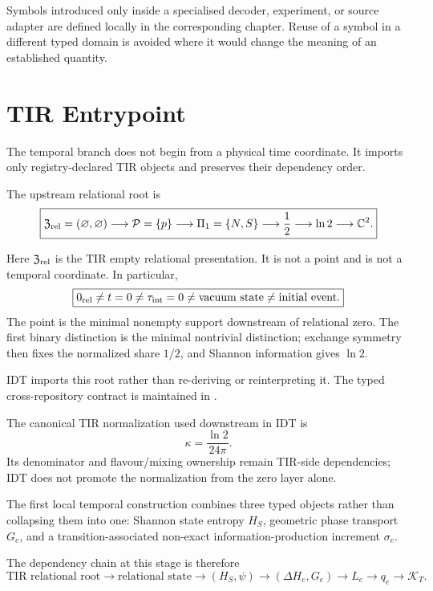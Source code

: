 Symbols introduced only inside a specialised decoder, experiment, or source adapter are defined locally in the corresponding chapter. Reuse of a symbol in a different typed domain is avoided where it would change the meaning of an established quantity.


\chapter{TIR Entrypoint}

The temporal branch does not begin from a physical time coordinate. It imports only registry-declared TIR objects and preserves their dependency order.

The upstream relational root is
\[
\boxed{
\mathfrak Z_{\rm rel}
=
(\varnothing,\varnothing)
\longrightarrow
\mathcal P=\{p\}
\longrightarrow
\Pi_1=\{N,S\}
\longrightarrow
\frac12
\longrightarrow
\ln2
\longrightarrow
\mathbb C^2.
}
\]

Here $\mathfrak Z_{\rm rel}$ is the TIR empty relational presentation. It is not a point and is not a temporal coordinate. In particular,
\[
\boxed{
0_{\rm rel}
\neq
t=0
\neq
\tau_{\rm int}=0
\neq
\text{vacuum state}
\neq
\text{initial event}.
}
\]
The point is the minimal nonempty support downstream of relational zero. The first binary distinction is the minimal nontrivial distinction; exchange symmetry then fixes the normalized share $1/2$, and Shannon information gives $\ln2$.

IDT imports this root rather than re-deriving or reinterpreting it. The typed cross-repository contract is maintained in
.

The canonical TIR normalization used downstream in IDT is
\[
\kappa=\frac{\ln2}{24\pi}.
\]
Its denominator and flavour/mixing ownership remain TIR-side dependencies; IDT does not promote the normalization from the zero layer alone.

The first local temporal construction combines three typed objects rather than collapsing them into one: Shannon state entropy $H_S$, geometric phase transport $G_e$, and a transition-associated non-exact information-production increment $\sigma_e$.

The dependency chain at this stage is therefore
\[
\boxed{
\text{TIR relational root}
\longrightarrow
\text{relational state}
\longrightarrow
(H_S,\psi)
\longrightarrow
(\Delta H_e,G_e)
\longrightarrow
L_e
\longrightarrow
q_e
\longrightarrow
\mathcal K_T.
}
\]

